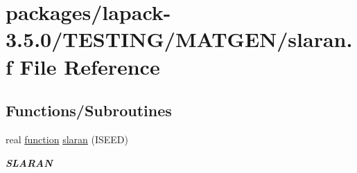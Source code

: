 \hypertarget{slaran_8f}{}\section{packages/lapack-\/3.5.0/\+T\+E\+S\+T\+I\+N\+G/\+M\+A\+T\+G\+E\+N/slaran.f File Reference}
\label{slaran_8f}
\subsection*{Functions/\+Subroutines}
\begin{DoxyCompactItemize}
\item 
real \hyperlink{afunc_8m_a7b5e596df91eadea6c537c0825e894a7}{function} \hyperlink{group__real__matgen_ga7306778b5c8bc3590e83b806c9a57f1b}{slaran} (I\+S\+E\+E\+D)
\begin{DoxyCompactList}\small\item\em {\bfseries S\+L\+A\+R\+A\+N} \end{DoxyCompactList}\end{DoxyCompactItemize}
